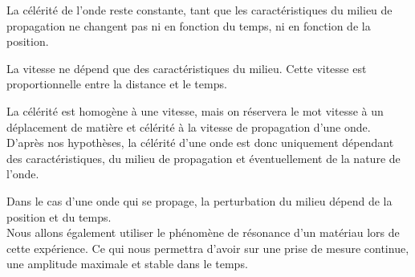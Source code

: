 La célérité de l'onde reste constante, tant que les caractéristiques 
du milieu de propagation ne changent pas ni en fonction du temps, 
ni en fonction de la position. 

La vitesse ne dépend que des caractéristiques du milieu.
Cette vitesse est proportionnelle entre la distance et le temps.

La célérité est homogène à une vitesse, mais on réservera le mot vitesse 
à un déplacement de matière et célérité à la vitesse de propagation 
d’une onde. \\
D’après nos hypothèses, la célérité d’une onde est donc uniquement 
dépendant des caractéristiques, du milieu de propagation et éventuellement 
de la nature de l’onde.

Dans le cas d’une onde qui se propage, la perturbation du milieu dépend 
de la position et du temps.\\

Nous allons également utiliser le phénomène de résonance d'un matériau 
lors de cette expérience. Ce qui nous permettra d'avoir sur une prise de 
mesure continue, une amplitude maximale et stable dans le temps.


\newpage

